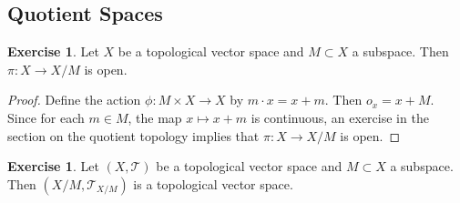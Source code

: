 \documentclass[12pt]{amsart}
\theoremstyle{definition}
\newtheorem{ex}[definition]{Exercise}
\newcommand{\MT}{\mathcal{T}}
\begin{document}
	























	\newpage
	\subsection{Quotient Spaces}
	
	\begin{ex}
		Let $X$ be a topological vector space and $M \subset X$ a subspace. Then $\pi: X \rightarrow X / M$ is open. 
	\end{ex}

	\begin{proof}
		Define the action $\phi: M \times X \rightarrow X$ by $m \cdot x = x + m$. Then $o_x = x+ M$. Since for each $m \in M$, the map $x \mapsto x +m$ is continuous, an exercise in the section on the quotient topology implies that $\pi: X \rightarrow X/M$ is open.  
	\end{proof}
	
	\begin{ex}
		Let $(X, \MT)$ be a topological vector space and $M \subset X$ a subspace. Then $(X/M, \MT_{X/M})$ is a topological vector space.
	\end{ex}
\end{document}
